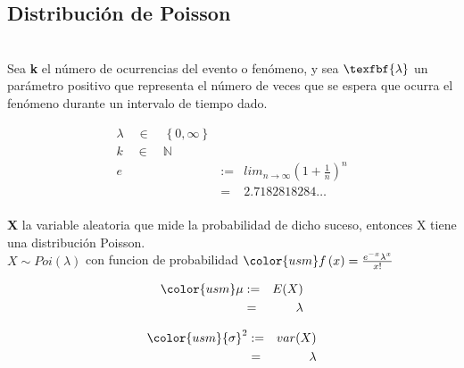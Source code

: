     \newpage
    
    \subsection{Distribución de Poisson}\\
    Sea \textbf{k} el número de ocurrencias del evento o fenómeno, y sea $\texfbf{\lambda}$ un parámetro positivo que representa el número de veces que se espera que ocurra el fenómeno durante un intervalo de tiempo dado.
    
    \begin{minipage}[b]{\textwidth}
\begin{minipage}[b]{0.5 \textwidth}
 \begin{eqnarray*}
        \lambda \quad \in \quad \left\{ 0,\infty  \right\}\\
        k\quad \in \quad \mathbb{N}\\
        
        e & := &{ lim }_{ n\rightarrow \infty  }{ \left( 1+\frac { 1 }{ n }  \right)  }^{ n }\\
            & = & 2.7182818284 \dots\\
    \end{eqnarray*}
\end{minipage} \hfill \begin{minipage}[b]{0.5 \textwidth}
    
\end{minipage}
\end{minipage}
    
    \textbf{X} la variable aleatoria que mide la probabilidad de dicho suceso, entonces X tiene una distribución Poisson.\\
    $X \sim Poi(\lambda)$ con funcion de probabilidad $ {\color{usm} f\left( x \right) =\frac { { e }^{ -x }{ \lambda  }^{ x } }{ x! } } $\\
    
 \begin{minipage}[b]{\textwidth}
\begin{minipage}[b]{0.5 \textwidth}
 \begin{eqnarray*}
        {\color{usm}\mu} & := & E(X) & \\
                            & = & \lambda
    \end{eqnarray*}
\end{minipage} \hfill \begin{minipage}[b]{0.5 \textwidth}
\begin{eqnarray*}
        {\color{usm}{ \sigma  }^{ 2 }} & := &  var(X) \\
                                        & = & \lambda
    \end{eqnarray*}
\end{minipage}
\end{minipage}

